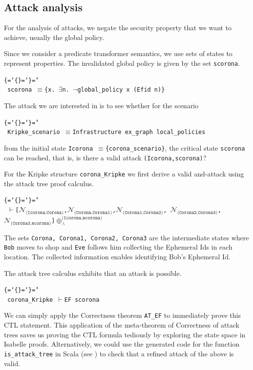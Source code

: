 \documentclass{llncs}
\newenvironment{ttbox}{\begin{alltt}\ttbraces\small\tt}%
                      {\end{alltt}}
\def\ttbraces{\let\.=\nobreak\chardef\{=`\{\chardef\}=`\}\chardef\|=`\\}
\newcommand\ttequiv{\mbox{{$\equiv$}}}
\newcommand\ttexists{\mbox{{$\exists$}}}
\newcommand\ttneg{\mbox{{$\neg$}}}
\newcommand\ttvdash{\mbox{{$\vdash$}}}
\newcommand{\ttcalN}[1]{\mbox{{${\mathcal{N}}_{\texttt{#1}}$}}}
\newcommand\ttattand[1]{\mbox{{$\oplus_{\wedge}^{#1}$}}}
\begin{document}
\subsection{Attack analysis}
\label{sec:ana}
For the analysis of attacks, we negate the security property that we want to achieve,
usually the global policy.

Since we consider a predicate transformer semantics, we use
sets of states to represent properties. 
The invalidated global policy is given by the set \texttt{scorona}.
\begin{ttbox}
 scorona \ttequiv \{x. \ttexists n. \ttneg global_policy x (Efid n)\}
\end{ttbox}
The attack we are interested in is to see whether for the scenario
\begin{ttbox}
 Kripke\_scenario \ttequiv  Infrastructure ex_graph local_policies 
\end{ttbox}
from the initial state \texttt{Icorona \ttequiv \{corona\_scenario\}},
the critical state \texttt{scorona} can be reached,
that is, is there a valid attack \texttt{(Icorona,scorona)}?

For the Kripke structure \texttt{corona\_Kripke}
we first derive a valid and-attack using the attack tree proof calculus.
\begin{ttbox}
  \ttvdash [\ttcalN{(Icorona,Corona)},\ttcalN{(Corona,Corona1)},\ttcalN{(Corona1,Corona2)},
             \ttcalN{(Corona2,Corona3)},\ttcalN{(Corona3,scorona)}]\ttattand{\texttt{(Icorona,scorona)}}
\end{ttbox}
The sets \texttt{Corona, Corona1, Corona2, Corona3} are the intermediate states where
\texttt{Bob} moves to shop and \texttt{Eve} follows him collecting the Ephemeral Ids in each location.
The collected information enables identifying Bob's Ephemeral Id.

The attack tree calculus \cite{kam:18b} exhibits that an attack is possible.
\begin{ttbox}
 corona_Kripke \ttvdash {\sf EF} scorona
\end{ttbox}
We can simply apply the Correctness theorem \texttt{AT\_EF} to 
immediately prove this CTL statement. This application of the meta-theorem 
of Correctness of attack trees saves us proving the CTL formula tediously 
by exploring the state space in Isabelle proofs. Alternatively, we could use 
the generated code for the function \texttt{is\_attack\_tree} in Scala 
(see \cite{kam:18b}) to check that a refined attack of the above is valid.
\end{document}
